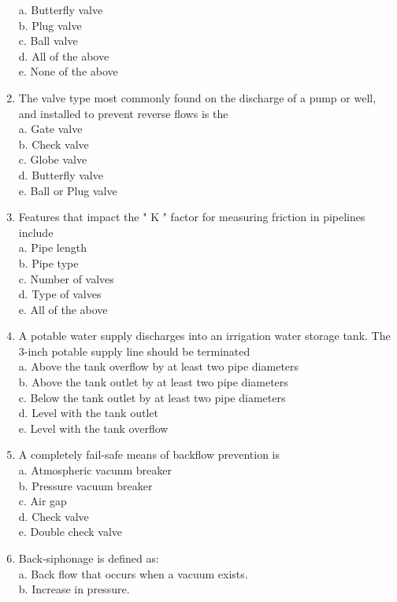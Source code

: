 \begin{enumerate}[1.]
a. Butterfly valve\\
b. Plug valve\\
c. Ball valve\\
d. All of the above\\
e. None of the above\\
\item The valve type most commonly found on the discharge of a pump or well, and installed to prevent reverse flows is the\\
a. Gate valve\\
b. Check valve\\
c. Globe valve\\
d. Butterfly valve\\
e. Ball or Plug valve\\
\item Features that impact the " $\mathrm{K}$ " factor for measuring friction in pipelines include\\
a. Pipe length\\
b. Pipe type\\
c. Number of valves\\
d. Type of valves\\
e. All of the above\\
\item A potable water supply discharges into an irrigation water storage tank. The 3-inch potable supply line should be terminated\\
a. Above the tank overflow by at least two pipe diameters\\
b. Above the tank outlet by at least two pipe diameters\\
c. Below the tank outlet by at least two pipe diameters\\
d. Level with the tank outlet\\
e. Level with the tank overflow\\
\item A completely fail-safe means of backflow prevention is\\
a. Atmospheric vacunm breaker\\
b. Pressure vacuum breaker\\
c. Air gap\\
d. Check valve\\
e. Double check valve\\
\item Back-siphonage is defined as:\\
a. Back flow that occurs when a vacuum exists.\\
b. Increase in pressure.\\

\end{enumerate}
